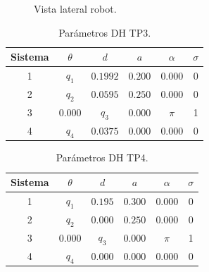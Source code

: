 \documentclass[a4paper,12pt]{article}
\begin{document}
\begin{figure}[H]
    \centering
    \begin{adjustbox}{scale = 0.72, max width=\columnwidth}
    \end{adjustbox}
    \caption{Vista lateral robot.}
    \label{vista lateral}
\end{figure}

\begin{table}[H]
    \centering
    \begin{tabular}{|c|c|c|c|c|c|}
    \hline
    Sistema & $\theta$  & $d$           & $a$      & $\alpha$ & $\sigma$ \\ \hline
    1       & $q_1$     & $0.1992$      & $0.200$  & 0.000    & 0        \\ \hline
    2       & $q_2$     & $0.0595$      & $0.250$  & 0.000    & 0        \\ \hline
    3       & $0.000$   & $q_3$         & $0.000$  & $\pi$      & 1        \\ \hline
    4       & $q_4$     & $0.0375$      & $0.000$  & 0.000    & 0        \\ \hline
    \end{tabular}
    \caption{Parámetros DH TP3.}
    \label{DH TP3}
\end{table}

\begin{table}[H]
    \centering
    \begin{tabular}{|c|c|c|c|c|c|}
    \hline
    Sistema & $\theta$  & $d$           & $a$      & $\alpha$ & $\sigma$ \\ \hline
    1       & $q_1$     & $0.195$       & $0.300$  & 0.000    & 0        \\ \hline
    2       & $q_2$     & $0.000$       & $0.250$  & 0.000    & 0        \\ \hline
    3       & $0.000$   & $q_3$         & $0.000$  & $\pi$      & 1        \\ \hline
    4       & $q_4$     & $0.000$       & $0.000$  & 0.000    & 0        \\ \hline
    \end{tabular}
    \caption{Parámetros DH TP4.}
    \label{DH TP4}
\end{table}
\end{document}
